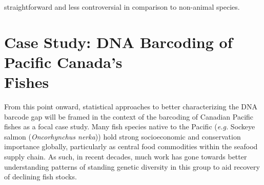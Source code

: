 straightforward and less controversial in comparison to non-animal species.



\section{Case Study: DNA Barcoding of Pacific Canada's \\ Fishes}

From this point onward, statistical approaches to better characterizing the DNA barcode gap will be framed in the context of the barcoding of Canadian Pacific fishes as a focal case study. Many fish species native to the Pacific (\textit{e.g.} Sockeye salmon (\textit{Oncorhynchus nerka})) hold strong socioeconomic and conservation importance globally, particularly as central food commodities within the seafood supply chain. As such, in recent decades, much work has gone towards better understanding patterns of standing genetic diversity in this group to aid recovery of declining fish stocks.   



